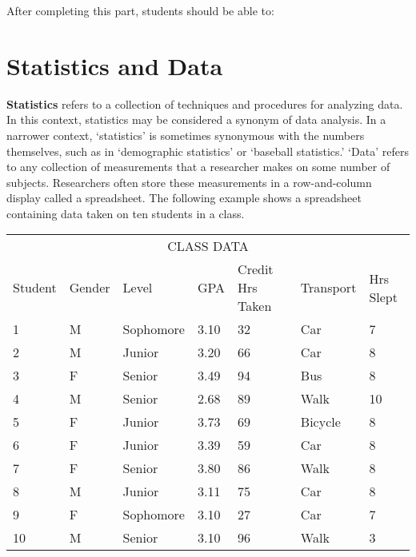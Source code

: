 \documentclass[11pt]{book}\usepackage[]{graphicx}\usepackage[]{color}
\begin{document}
After completing this part, students should be able to:


\section{Statistics and Data}

\textbf{Statistics} refers to a collection of techniques and procedures for analyzing data.  In this context, statistics may be considered a synonym of data analysis.  In a narrower context, `statistics' is sometimes synonymous with the numbers themselves, such as in `demographic statistics' or `baseball statistics.'  `Data' refers to any collection of measurements that a researcher makes on some number of subjects.  Researchers often store these measurements in a row-and-column display called a spreadsheet.  The following example shows a spreadsheet containing data taken on ten students in a class.

  \begin{table}[htbp]
   \centering
  \begin{tabular}{@{} p{14mm} p{13mm} p{20mm} p{9mm} p{32mm} p{18mm} p{21mm} @{}} \hline %
   \multicolumn{7}{c}{CLASS DATA} \\
   Student & Gender & Level & GPA & Credit Hrs Taken & Transport & Hrs Slept \\ \hline
   1 & M & Sophomore & 3.10 & 32 & Car & 7 \\
   2 & M & Junior & 3.20 & 66 & Car & 8 \\
   3 & F & Senior & 3.49 & 94 & Bus & 8 \\
   4 & M & Senior & 2.68 & 89 & Walk & 10 \\
   5 & F & Junior & 3.73 & 69 & Bicycle & 8 \\
   6 & F & Junior & 3.39 & 59 & Car & 8 \\
   7 & F & Senior & 3.80 & 86 & Walk & 8 \\
   8 & M & Junior & 3.11 & 75 & Car & 8 \\
   9 & F & Sophomore & 3.10 & 27 & Car & 7 \\
   10 & M & Senior & 3.10 & 96 & Walk & 3 \\ \hline
   \end{tabular}
   \end{table}
\end{document}
